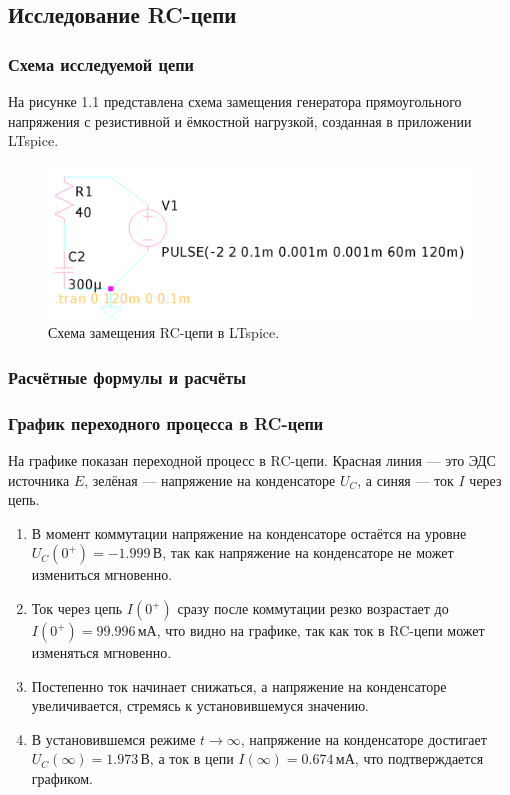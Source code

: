 \subsection{Исследование RC-цепи}

\subsubsection{Схема исследуемой цепи}
На рисунке 1.1 представлена схема замещения генератора прямоугольного напряжения с резистивной и ёмкостной нагрузкой, созданная в приложении LTspice.

\begin{figure}[H]
	\centering
	\includegraphics[width=1\textwidth]{./data/rc-schema.png}
	\caption{Схема замещения RC-цепи в LTspice.}
\end{figure}

\subsubsection{Расчётные формулы и расчёты}


\subsubsection{График переходного процесса в RC-цепи}
На графике показан переходной процесс в RC-цепи. Красная линия — это ЭДС источника \( E \), зелёная — напряжение на конденсаторе \( U_C \), а синяя — ток \( I \) через цепь.

\begin{enumerate}[noitemsep,topsep=0pt,left=6pt,label=\arabic*.]
	\item В момент коммутации напряжение на конденсаторе остаётся на уровне \( U_C(0^+) = -1.999 \, \text{В} \), так как напряжение на конденсаторе не может измениться мгновенно.
	\item Ток через цепь \( I(0^+) \) сразу после коммутации резко возрастает до \( I(0^+) = 99.996 \, \text{мА} \), что видно на графике, так как ток в RC-цепи может изменяться мгновенно.
	\item Постепенно ток начинает снижаться, а напряжение на конденсаторе увеличивается, стремясь к установившемуся значению.
	\item В установившемся режиме \( t \to \infty \), напряжение на конденсаторе достигает \( U_C(\infty) = 1.973 \, \text{В} \), а ток в цепи \( I(\infty) = 0.674 \, \text{мА} \), что подтверждается графиком.
\end{enumerate}

